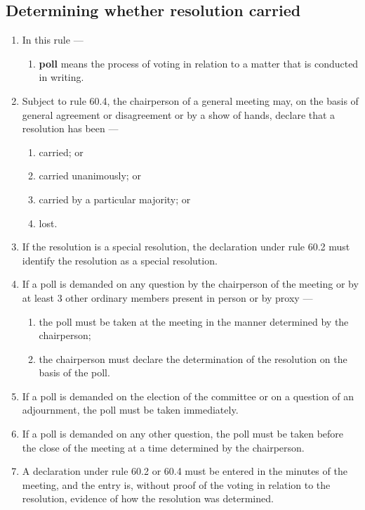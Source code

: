 \documentclass[../constitution.tex]{subfiles}
\begin{document}
\hypertarget{determining-whether-resolution-carried}{%
\subsection{Determining whether resolution carried}\label{determining-whether-resolution-carried}}

\begin{enumerate}

\item In this rule ---

  \begin{enumerate}
  
  \item \textbf{poll} means the process of voting in relation to a matter that is conducted in writing.
  \end{enumerate}
\item Subject to rule 60.4, the chairperson of a general meeting may, on the basis of general agreement or disagreement or by a show of hands, declare that a resolution has been ---

  \begin{enumerate}
  
  \item carried; or
  \item carried unanimously; or
  \item carried by a particular majority; or
  \item lost.
  \end{enumerate}
\item If the resolution is a special resolution, the declaration under rule 60.2 must identify the resolution as a special resolution.
\item If a poll is demanded on any question by the chairperson of the meeting or by at least 3 other ordinary members present in person or by proxy ---

  \begin{enumerate}
  
  \item the poll must be taken at the meeting in the manner determined by the chairperson;
  \item the chairperson must declare the determination of the resolution on the basis of the poll.
  \end{enumerate}
\item If a poll is demanded on the election of the committee or on a question of an adjournment, the poll must be taken immediately.
\item If a poll is demanded on any other question, the poll must be taken before the close of the meeting at a time determined by the chairperson.
\item A declaration under rule 60.2 or 60.4 must be entered in the minutes of the meeting, and the entry is, without proof of the voting in relation to the resolution, evidence of how the resolution was determined.
\end{enumerate}
\end{document}
